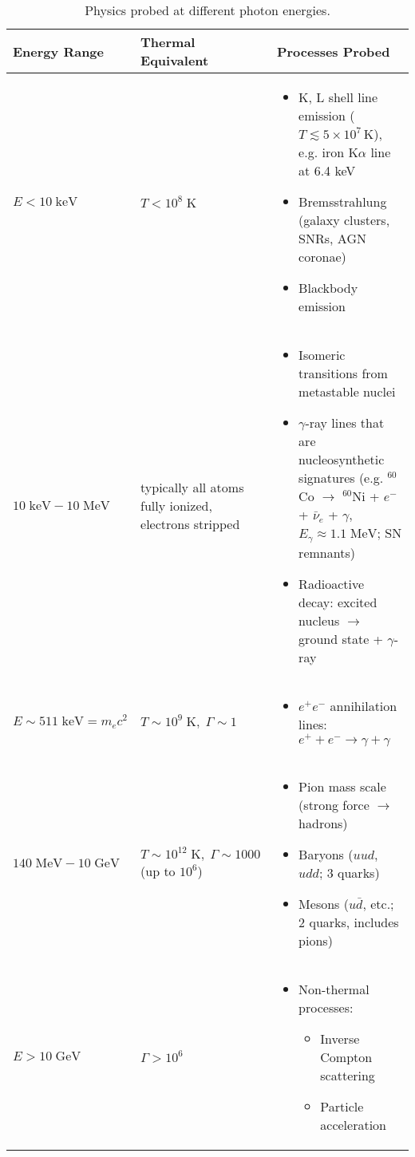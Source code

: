 \begin{table}[htp!]
\centering
\renewcommand{\arraystretch}{1.3}
\begin{tabular}{|p{3cm}|p{3cm}|p{8cm}|}
\hline
\textbf{Energy Range} & \textbf{Thermal Equivalent} & \textbf{Processes Probed} \\
\hline
$E < 10\;\mathrm{keV}$ 
& $T < 10^{8}\;\mathrm{K}$ 
& 
\begin{itemize}
  \item K, L shell line emission ($T \lesssim 5\times 10^{7}\,$K), e.g. iron K$\alpha$ line at 6.4 keV  
  \item Bremsstrahlung (galaxy clusters, SNRs, AGN coronae)  
  \item Blackbody emission
\end{itemize} \\
\hline
$10\;\mathrm{keV} - 10\;\mathrm{MeV}$ 
& typically all atoms fully ionized, electrons stripped 
& 
\begin{itemize}
  \item Isomeric transitions from metastable nuclei  
  \item $\gamma$-ray lines that are nucleosynthetic signatures (e.g. $^{60}$Co $\rightarrow$ $^{60}$Ni + $e^-$ + $\bar{\nu}_e$ + $\gamma$, $E_\gamma \approx 1.1\;\mathrm{MeV}$; SN remnants)  
  \item Radioactive decay: excited nucleus $\rightarrow$ ground state + $\gamma$-ray
\end{itemize} \\
\hline
$E \sim 511\;\mathrm{keV} = m_e c^2$ 
& $T \sim 10^{9}\;\mathrm{K},\; \Gamma \sim 1$ 
& 
\begin{itemize}
  \item $e^+ e^-$ annihilation lines: $e^+ + e^- \rightarrow \gamma + \gamma$
\end{itemize} \\
\hline
$140\;\mathrm{MeV} - 10\;\mathrm{GeV}$ 
& $T \sim 10^{12}\;\mathrm{K},\; \Gamma \sim 1000$ (up to $10^{6}$) 
& 
\begin{itemize}
  \item Pion mass scale (strong force $\rightarrow$ hadrons)  
  \item Baryons ($uud$, $udd$; 3 quarks)  
  \item Mesons ($u\bar{d}$, etc.; 2 quarks, includes pions)
\end{itemize} \\
\hline
$E > 10\;\mathrm{GeV}$ 
& $\Gamma > 10^{6}$ 
& 
\begin{itemize}
  \item Non-thermal processes:  
  \begin{itemize}
    \item Inverse Compton scattering  
    \item Particle acceleration
  \end{itemize}
\end{itemize} \\
\hline
\end{tabular}
\caption{Physics probed at different photon energies.}
\end{table}



